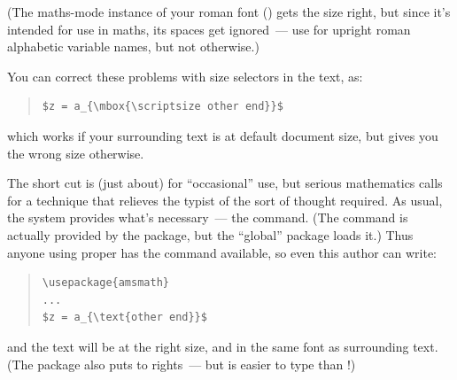 (The maths-mode instance of your roman font () gets the
size right, but since it's intended for use in maths, its spaces get
ignored~--- use  for upright roman alphabetic variable
names, but not otherwise.)

You can correct these problems with size selectors in the text, as:
\begin{quote}
\begin{verbatim}
$z = a_{\mbox{\scriptsize other end}}$
\end{verbatim}
\end{quote}
which works if your surrounding text is at default document size, but
gives you the wrong size otherwise.

The  short cut is (just about)  for ``occasional''
use, but serious mathematics calls for a technique that
relieves the typist of the sort of thought required.  As usual, the
\AMSLaTeX{} system provides what's necessary~--- the 
command.  (The command is actually provided by the 
package, but the ``global''  package loads it.)  Thus
anyone using \AMSLaTeX{} proper has the command available, so even
this author can write:
\begin{quote}
\begin{verbatim}
\usepackage{amsmath}
...
$z = a_{\text{other end}}$
\end{verbatim}
\end{quote}
and the text will be at the right size, and in the same font as
surrounding text.  (The  package also puts
 to rights~--- but  is easier to type than
!)

